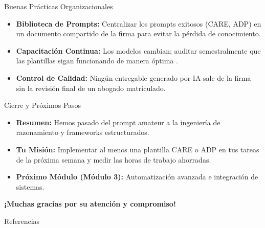 \documentclass[aspectratio=169]{beamer}
\begin{document}
\begin{frame}[fragile]{Buenas Prácticas Organizacionales}


\begin{itemize}
  \item \textbf{Biblioteca de Prompts:} Centralizar los prompts exitosos (CARE, ADP) en un documento compartido de la firma para evitar la pérdida de conocimiento.
  \item \textbf{Capacitación Continua:} Los modelos cambian; auditar semestralmente que las plantillas sigan funcionando de manera óptima \cite{sal2024}.
  \item \textbf{Control de Calidad:} Ningún entregable generado por IA sale de la firma sin la revisión final de un abogado matriculado.
\end{itemize}
\end{frame}



\begin{frame}[fragile]{Cierre y Próximos Pasos}


\begin{itemize}
  \item \textbf{Resumen:} Hemos pasado del prompt amateur a la ingeniería de razonamiento y frameworks estructurados.
  \item \textbf{Tu Misión:} Implementar al menos una plantilla CARE o ADP en tus tareas de la próxima semana y medir las horas de trabajo ahorradas.
  \item \textbf{Próximo Módulo (Módulo 3):} Automatización avanzada e integración de sistemas.
\end{itemize}
\textbf{¡Muchas gracias por su atención y compromiso!}

\end{frame}



\begin{frame}[allowframebreaks]{Referencias}
  
  
\end{frame}
\end{document}
